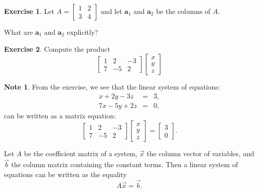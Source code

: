 \documentclass[handout]{beamer}
\newcommand{\vecb}{\vec{b}}
\newcommand{\vecx}{\vec{x}}
\newcommand{\fn}{\insertframenumber}
\theoremstyle{definition}
\newtheorem{exercise}{Exercise}
\newtheorem*{nb}{Note}
\begin{document}
\begin{frame}{\fn}
	\begin{exercise}
		Let $A=\begin{bmatrix}
		1&2\\3&4
		\end{bmatrix}$ and let $\mathbf{a}_1 $ and $\mathbf{a}_2$ be the columns of $A$.  
		
		What are $\mathbf{a}_1$ and $\mathbf{a}_2$ explicitly?
	\end{exercise}
	\begin{exercise}
		Compute the product
			\[\begin{bmatrix}
			1&2&-3\\
			7&-5&2
			\end{bmatrix}
			\begin{bmatrix}
			x\\y\\z
			\end{bmatrix}\]
	\end{exercise}
\end{frame}
\begin{frame}{\fn}
	\begin{nb} 
		From the exercise, we see that the linear system of equations:
			\begin{eqnarray*}
			x+2y-3z&=&3,\\7x-5y+2z&=&0,
			\end{eqnarray*} 
		can be written as a matrix equation:
	\[\begin{bmatrix}
		1&2&-3\\
		7&-5&2
		\end{bmatrix}
		\begin{bmatrix}
		x\\y\\z
		\end{bmatrix}
		=
		\begin{bmatrix}
		3\\0
		\end{bmatrix}\!.
		\]
		
	Let $A$ be the coefficient matrix of a system, $\vec x$ the column vector of variables, and $\vecb$ the column matrix containing the constant terms.  Then a linear system of equations can be written as the equality
	\[A\vecx=\vecb.\]
	\end{nb}
\end{frame}
\end{document}
